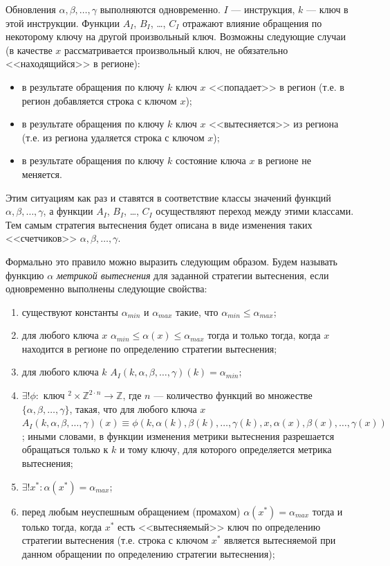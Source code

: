 \documentclass[14pt]{extreport}
\begin{document}
Обновления $\alpha, \beta, \dots, \gamma$ выполняются одновременно. $I$ ---
инструкция, $k$ --- ключ в этой инструкции. Функции $A_I$, $B_I$, \dots, $C_I$
отражают влияние обращения по некоторому ключу на другой произвольный ключ.
Возможны следующие случаи (в качестве $x$ рассматривается произвольный ключ, не
обязательно <<находящийся>> в регионе):
\begin{itemize}
    \item в результате обращения по ключу $k$ ключ $x$ <<попадает>> в регион
(т.е. в регион добавляется строка с ключом $x$);
    \item в результате обращения по ключу $k$ ключ $x$ <<вытесняется>> из
региона (т.е. из региона удаляется строка с ключом $x$);
    \item в результате обращения по ключу $k$ состояние ключа $x$ в регионе не
меняется.
\end{itemize}

Этим ситуациям как раз и ставятся в соответствие классы значений функций
$\alpha, \beta, \dots, \gamma$, а функции $A_I$, $B_I$, \dots, $C_I$
осуществляют переход между этими классами. Тем самым стратегия вытеснения будет
описана в виде изменения таких <<счетчиков>> $\alpha, \beta, \dots, \gamma$.

Формально это правило можно выразить следующим образом. Будем называть функцию
$\alpha$ \emph{метрикой вытеснения} для заданной стратегии вытеснения, если
одновременно выполнены следующие свойства:
\begin{enumerate}
  \item существуют константы $\alpha_{min}$ и $\alpha_{max}$ такие, что
$\alpha_{min} \leqslant \alpha_{max}$;
  \item для любого ключа $x$ $\alpha_{min} \leqslant \alpha(x) \leqslant
\alpha_{max}$ тогда и только тогда, когда $x$ находится в регионе по определению
стратегии вытеснения;
  \item для любого ключа $k$ $A_I(k, \alpha,\beta,\dots,\gamma) (k) =
\alpha_{min}$;
  \item $\exists! \phi: \mbox{~ключ~}^2 \times \mathds{Z}^{2\cdot n} \rightarrow
\mathds{Z}$, где $n$ --- количество функций во множестве
$\{\alpha,\beta,\dots,\gamma\}$, такая, что для любого ключа $x$ $A_I(k,
\alpha,\beta,\dots,\gamma)(x) \equiv \phi(k, \alpha(k), \beta(k), \dots,
\gamma(k), x, \alpha(x), \beta(x), \dots, \gamma(x))$; иными словами, в функции
изменения метрики вытеснения разрешается обращаться только к $k$ и тому ключу,
для которого определяется метрика вытеснения;
  \item $\exists! x^* : \alpha(x^*) = \alpha_{max}$;
  \item перед любым неуспешным обращением (промахом) $\alpha(x^*) =
\alpha_{max}$ тогда и только тогда, когда $x^*$ есть <<вытесняемый>> ключ по
определению стратегии вытеснения (т.е. строка с ключом $x^*$ является
вытесняемой при данном обращении по определению стратегии вытеснения);
\end{enumerate}
\end{document}
